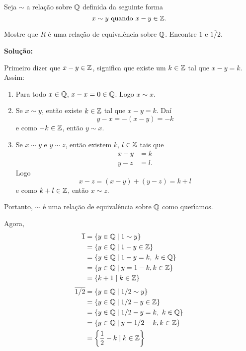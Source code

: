 \documentclass[12pt]{exam}
\begin{document}
\vspace{.5cm}

\questao Seja $\sim$ a relação sobre $\mathbb{Q}$ definida da seguinte forma
\[
	x\sim y \mbox{ quando } x - y \in \mathbb{Z}.
\]

Mostre que $R$ \'e uma rela{\c c}{\~a}o de equival{\^e}ncia sobre $\mathbb{Q}$. Encontre $\overline{1}$ e $\overline{1/2}$.


\noindent\textbf{Solu\c{c}\~ao:}

Primeiro dizer que $x - y \in \mathbb{Z}$, significa que existe um $k \in \mathbb{Z}$ tal que $x - y = k$. Assim:
\begin{enumerate}[label={\roman*})]
	\item Para todo $x \in \mathbb{Q}$, $x - x = 0 \in \mathbb{Q}$. Logo $x \sim x$.
	\item Se $x \sim y$, então existe $k \in \mathbb{Z}$ tal que $x - y = k$. Daí
	\[
		y - x = -(x - y) = -k
	\]
	e como $-k \in \mathbb{Z}$, então $y \sim x$.
	\item Se $x \sim y$ e $y \sim z$, então existem $k$, $l \in \mathbb{Z}$ tais que
	\begin{align*}
		x - y &= k\\
		y - z &= l.
	\end{align*}
	Logo
	\[
		x - z = (x - y) + (y - z) = k + l
	\]
	e como $k + l \in \mathbb{Z}$, então $x \sim z$.
\end{enumerate}

Portanto, $\sim$ \'e uma rela\c{c}\~ao de equival\^encia sobre $\mathbb{Q}$ como quer{\'\i}amos.

Agora,
\begin{align*}
	\overline{1} &= \{y \in \mathbb{Q} \mid 1 \sim y\} \\&= \{y \in \mathbb{Q} \mid 1 - y \in \mathbb{Z}\} \\&= \{y \in \mathbb{Q} \mid 1 - y = k,\ k \in \mathbb{Q}\}\\&= \{y \in \mathbb{Q} \mid y = 1 - k, k \in \mathbb{Z}\} \\&= \{k + 1 \mid k \in \mathbb{Z}\}
\end{align*}
\begin{align*}
	\overline{1/2} &= \{y \in \rac \mid 1/2 \sim y\} \\&= \{y \in \rac \mid 1/2 - y \in \z\} \\&= \{y \in \rac \mid 1/2 - y = k,\ k \in \rac\} \\&= \{y \in \rac \mid y = 1/2 - k, k \in \z\} \\&= \left\{\dfrac{1}{2} - k \mid k \in \z\right\}
\end{align*}
\end{document}
